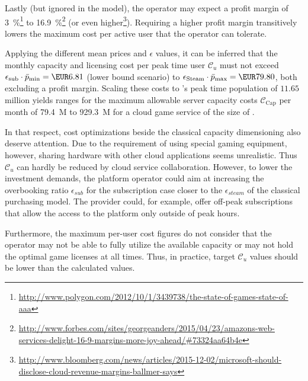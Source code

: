 Lastly (but ignored in the model), the operator may expect a profit margin of \SI{3}{\percent}\footnote{\url{http://www.polygon.com/2012/10/1/3439738/the-state-of-games-state-of-aaa}} to \SI{16.9}{\percent}\footnote{\url{http://www.forbes.com/sites/georgeanders/2015/04/23/amazons-web-services-delight-16-9-margins-more-joy-ahead/\#73324aa64b4e}} (or even higher\footnote{\url{http://www.bloomberg.com/news/articles/2015-12-02/microsoft-should-disclose-cloud-revenue-margins-ballmer-says}}). Requiring a higher profit margin transitively lowers the maximum cost per active user that the operator can tolerate.

Applying the different mean prices and $\epsilon$ values, it can be inferred that the monthly capacity and licensing cost per peak time user $\mathcal{C}_u$ must not exceed $\epsilon_{\text{sub}} \cdot \bar{p}_{\text{min}} = \SI{6.81}[\EUR]{}$ (lower bound scenario) to $\epsilon_{\text{Steam}} \cdot \bar{p}_{\text{max}} = \SI{79.80}[\EUR]{}$, both excluding a profit margin. Scaling these costs to \steam's peak time population of $11.65$ million yields ranges for the maximum allowable server capacity costs $\mathcal{C}_{\text{Cap}}$ per month of \SI{79.4}[\EUR]{M} to \SI{929.3}[\EUR]{M} for a cloud game service of the size of \steam.

In that respect, cost optimizations beside the classical capacity dimensioning also deserve attention. Due to the requirement of using special gaming equipment, however, sharing hardware with other cloud applications seems unrealistic. Thus $\mathcal{C}_u$ can hardly be reduced by cloud service collaboration. However, to lower the investment demands, the platform operator could aim at increasing the overbooking ratio $\epsilon_{sub}$ for the subscription case closer to the $\epsilon_{steam}$ of the classical purchasing model. The provider could, for example, offer off-peak subscriptions that allow the access to the platform only outside of peak hours.

Furthermore, the maximum per-user cost figures do not consider that the operator may not be able to fully utilize the available capacity or may not hold the optimal game licenses at all times. Thus, in practice, target $\mathcal{C}_{u}$ values should be lower than the calculated values.

